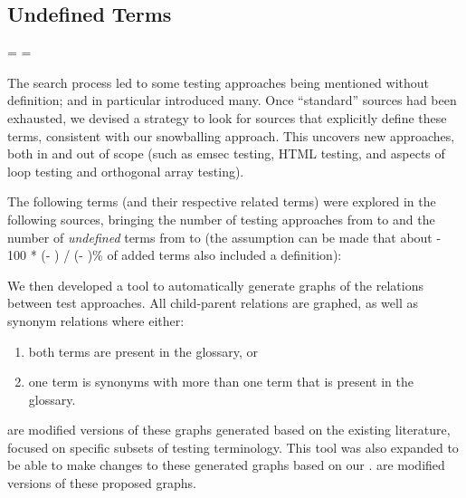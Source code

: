 \subsection{Undefined Terms}
\label{undef-terms}


\newcount\TotalBefore
\newcount\UndefBefore
{}

\newcount\TotalAfter
\newcount\UndefAfter
\TotalAfter=
\UndefAfter=

The search process led to some testing approaches being
mentioned without definition;
\citep{IEEE2022} and \citep{Firesmith2015} in particular introduced many.
Once ``standard'' sources had been exhausted, we devised a strategy to
look for sources that explicitly define these terms, consistent with
our snowballing approach. This uncovers new approaches, both in and out of
scope (such as \acf{emsec} testing, HTML testing, and aspects of loop testing and
orthogonal array testing).

The following terms (and their respective related terms) were explored%
\ifnotpaper in the following sources\fi, bringing the number of testing
approaches from \the\TotalBefore{} to \the\TotalAfter{} and the number of
\emph{undefined} terms from \the\UndefBefore{} to \the\UndefAfter{} (the
assumption can be made that about \the{} - 100 * (\UndefAfter -
\UndefBefore) / (\TotalAfter - \TotalBefore)\relax\% of added terms also
included a definition):



\ifnotpaper\else\ieeeTestTermsTable{}\fi

We then developed a tool to automatically generate graphs of the relations
between test approaches. All child-parent relations are graphed, as well as
synonym relations where either:
\begin{enumerate}
      \item both terms are present in the glossary, or
      \item one term is synonyms with more than one term that is present in the
            glossary.
\end{enumerate}
 are modified versions
of these graphs generated based on the existing literature, focused on specific
subsets of testing terminology. This tool was also expanded to be able to make
changes to these generated graphs based on our .
 are
modified versions of these proposed graphs.
